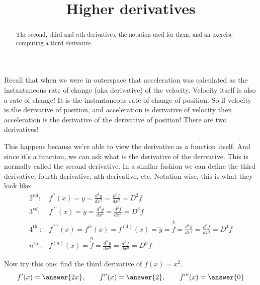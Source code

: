 \documentclass{ximera}
\title{Higher derivatives}
\begin{document}
\begin{abstract}
The second, third and $n$th derivatives, the notation used for them, and an exercise computing a third derivative.
\end{abstract}
\maketitle

Recall that when we were in outerspace that acceleration was calculated as the instantaneous rate of change (aka derivative) of the velocity. Velocity itself is also a rate of change! It is the instantaneous rate of change of position. So if velocity is the derivative of position, and acceleration is derivative of velocity then acceleration is the derivative of the derivative of position! There are two derivatives!

This happens because we're able to view the derivative as a function itself. And since it's a function, we can ask what is the derivative of the derivative. This is normally called the second derivative. In a similar fashion we can define the third derivative, fourth derivative, nth derivative, etc. Notation-wise, this is what they look like:
\[
\begin{array}{ll}
2^{n d}: & f^{\prime \prime}(x)=\ddot{y}=\frac{d^{2} y}{d x^{2}}=\frac{d^{2} f}{d x^{2}}=D^{2} f \\
3^{r d}: & f^{\prime \prime \prime}(x)=\dddot{y}=\frac{d^{3} y}{d x^{3}}=\frac{d^{3} f}{d x^{3}}=D^{3} f \\
4^{\text {th }}: & f^{\prime \prime \prime \prime}(x)=f^{i v}(x)=f^{(4)}(x)=\ddddot{y}=\stackrel{4}{\dot{f}}=\frac{d^{4} y}{d x^{4}}=\frac{d^{4} f}{d x^{4}}=D^{4} f \\
n^{\text {th }}: & f^{(n)}(x)=\stackrel{n}{\dot{f}}=\frac{d^{n} y}{d x^{n}}=\frac{d^{n} f}{d x^{n}}=D^{n} f
\end{array}
\]

\begin{exercise}\label{exercise:4-19}
Now try this one: find the third derivative of $f(x)=x^{2}$.
\[
f^{\prime}(x)=\answer{2x}, \qquad f^{\prime\prime}(x)=\answer{2}, \qquad f^{\prime\prime\prime}(x)=\answer{0}
\]
\end{exercise}
\end{document}
